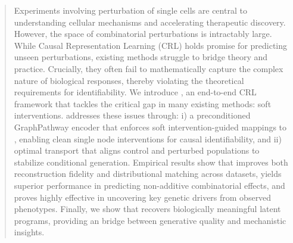 \begin{abstract}

Experiments involving perturbation of single cells are central to understanding cellular mechanisms and accelerating therapeutic discovery.
However, the space of combinatorial perturbations is intractably large.
While Causal Representation Learning (CRL) holds promise for predicting unseen perturbations, existing methods struggle to bridge theory and practice.
Crucially, they often fail to mathematically capture the complex nature of biological responses, thereby violating the theoretical requirements for identifiability.
We introduce , an end-to-end CRL framework that tackles the critical gap in many existing methods: soft interventions.
 addresses these issues through: i) a preconditioned GraphPathway encoder that enforces soft intervention-guided mappings to \cmps{}, enabling clean single node interventions for causal identifiability, and ii) optimal transport that aligns control and perturbed populations to stabilize conditional generation.
Empirical results show that  improves both reconstruction fidelity and distributional matching across datasets, yields superior performance in predicting non-additive combinatorial effects, and proves highly effective in uncovering key genetic drivers from observed phenotypes.
Finally, we show that  recovers biologically meaningful latent programs, providing an bridge between generative quality and mechanistic insights.
\end{abstract}
